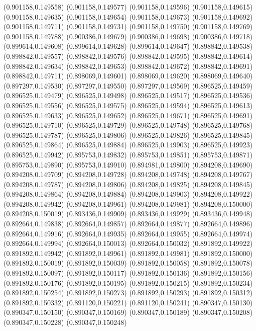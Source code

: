 (0.901158,0.149558)
(0.901158,0.149577)
(0.901158,0.149596)
(0.901158,0.149615)
(0.901158,0.149635)
(0.901158,0.149654)
(0.901158,0.149673)
(0.901158,0.149692)
(0.901158,0.149711)
(0.901158,0.149731)
(0.901158,0.149750)
(0.901158,0.149769)
(0.901158,0.149788)
(0.900386,0.149679)
(0.900386,0.149698)
(0.900386,0.149718)
(0.899614,0.149608)
(0.899614,0.149628)
(0.899614,0.149647)
(0.898842,0.149538)
(0.898842,0.149557)
(0.898842,0.149576)
(0.898842,0.149595)
(0.898842,0.149614)
(0.898842,0.149634)
(0.898842,0.149653)
(0.898842,0.149672)
(0.898842,0.149691)
(0.898842,0.149711)
(0.898069,0.149601)
(0.898069,0.149620)
(0.898069,0.149640)
(0.897297,0.149530)
(0.897297,0.149550)
(0.897297,0.149569)
(0.896525,0.149459)
(0.896525,0.149479)
(0.896525,0.149498)
(0.896525,0.149517)
(0.896525,0.149536)
(0.896525,0.149556)
(0.896525,0.149575)
(0.896525,0.149594)
(0.896525,0.149613)
(0.896525,0.149633)
(0.896525,0.149652)
(0.896525,0.149671)
(0.896525,0.149691)
(0.896525,0.149710)
(0.896525,0.149729)
(0.896525,0.149748)
(0.896525,0.149768)
(0.896525,0.149787)
(0.896525,0.149806)
(0.896525,0.149826)
(0.896525,0.149845)
(0.896525,0.149864)
(0.896525,0.149884)
(0.896525,0.149903)
(0.896525,0.149923)
(0.896525,0.149942)
(0.895753,0.149832)
(0.895753,0.149851)
(0.895753,0.149871)
(0.895753,0.149890)
(0.895753,0.149910)
(0.894981,0.149800)
(0.894208,0.149690)
(0.894208,0.149709)
(0.894208,0.149728)
(0.894208,0.149748)
(0.894208,0.149767)
(0.894208,0.149787)
(0.894208,0.149806)
(0.894208,0.149825)
(0.894208,0.149845)
(0.894208,0.149864)
(0.894208,0.149884)
(0.894208,0.149903)
(0.894208,0.149922)
(0.894208,0.149942)
(0.894208,0.149961)
(0.894208,0.149981)
(0.894208,0.150000)
(0.894208,0.150019)
(0.893436,0.149909)
(0.893436,0.149929)
(0.893436,0.149948)
(0.892664,0.149838)
(0.892664,0.149857)
(0.892664,0.149877)
(0.892664,0.149896)
(0.892664,0.149916)
(0.892664,0.149935)
(0.892664,0.149955)
(0.892664,0.149974)
(0.892664,0.149994)
(0.892664,0.150013)
(0.892664,0.150032)
(0.891892,0.149922)
(0.891892,0.149942)
(0.891892,0.149961)
(0.891892,0.149981)
(0.891892,0.150000)
(0.891892,0.150019)
(0.891892,0.150039)
(0.891892,0.150058)
(0.891892,0.150078)
(0.891892,0.150097)
(0.891892,0.150117)
(0.891892,0.150136)
(0.891892,0.150156)
(0.891892,0.150176)
(0.891892,0.150195)
(0.891892,0.150215)
(0.891892,0.150234)
(0.891892,0.150254)
(0.891892,0.150273)
(0.891892,0.150293)
(0.891892,0.150312)
(0.891892,0.150332)
(0.891120,0.150221)
(0.891120,0.150241)
(0.890347,0.150130)
(0.890347,0.150150)
(0.890347,0.150169)
(0.890347,0.150189)
(0.890347,0.150208)
(0.890347,0.150228)
(0.890347,0.150248)
